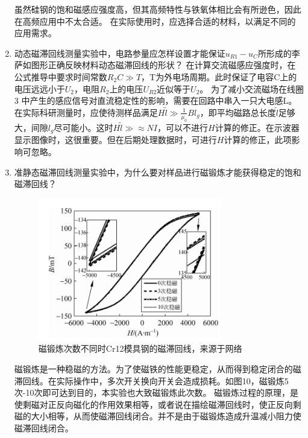 \documentclass[11pt]{article}
\begin{document}
\begin{enumerate}
        虽然硅钢的饱和磁感应强度高，但其高频特性与铁氧体相比会有所逊色，因此在高频应用中不太合适。
    \newline \hspace*{2em}在实际使用时，应选择合适的材料，以满足不同的应用需求。
    \item 动态磁滞回线测量实验中，电路参量应怎样设置才能保证$u_{R1}-u_C$所形成的李萨如图形正确反映材料动态磁滞回线的形状？
    \newline \hspace*{2em} 在计算交流磁感应强度时，在公式推导中要求时间常数$R_2C\gg T$，T为外电场周期。此时保证了电容C上的电压远远小于$U_{2}$，电阻$R_2$上的电压$U_{R2}$近似等于$U_{2}$。
    \newline \hspace*{2em} 为了减小交流磁场在线圈3 中产生的感应信号对直流稳定性的影响，需要在回路中串入一只大电感L。
    \newline \hspace*{2em} 在实际科研测量时，应使待测样品满足$H\tilde{l}\gg \frac{1}{\mu_0}Bl_g$，即平均磁路总长度$\tilde{l}$足够大，间隙$l_g$尽可能小。这时$H\tilde{l}\gg\approx NI$，可以不进行$H$计算的修正。在示波器显示图像时，这很重要。但在后期处理数据时，可进行$H$计算的修正，此项影响可忽略。
    \item 准静态磁滞回线测量实验中，为什么要对样品进行磁锻炼才能获得稳定的饱和磁滞回线？
    \begin{figure}[H]
        \centering
        \includegraphics[width=8cm]{Fig/11.png}
        \caption{磁锻炼次数不同时Cr12模具钢的磁滞回线，来源于网络}
    \end{figure}
    \hspace*{2em} 磁锻炼是一种稳磁的方法。为了使磁铁的性能更稳定，从而得到稳定闭合的磁滞回线。在实际操作中，多次开关换向开关会造成损耗。如图10，磁锻炼5次-10次即可达到目的，本实验也大致磁锻炼此次数。
    \newline \hspace*{2em}磁锻炼过程的原理，是使剩磁对正反向磁化的作用效果相等，或者说在描绘磁滞回线时，使正反向剩磁的大小相等，从而使磁滞回线闭合。并不是由于磁锻炼造成升温减小阻力使磁滞回线闭合。

\end{enumerate}
\end{document}
